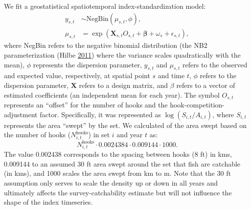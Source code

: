 \documentclass[11pt]{book}
\begin{document}
We fit a geostatistical spatiotemporal index-standardization model:
\begin{align}
  y_{s,t} &\sim \mathrm{NegBin}\left(\mu_{s,t}, \phi \right),\\
  \mu_{s,t} &= \exp \left( \bm{X}_{s,t} O_{s,t} + \bm{\beta} + \omega_s + \epsilon_{s,t} \right),
\label{eq:hbll-model}
\end{align}
where NegBin refers to the negative binomial distribution (the NB2 parameterization (Hilbe \protect\hyperlink{ref-hilbe2011}{2011}) where the variance scales quadratically with the mean), \(\phi\) represents the dispersion parameter, \(y_{s,t}\) and \(\mu_{s,t}\) refers to the observed and expected value, respectively, at spatial point \(s\) and time \(t\), \(\phi\) refers to the dispersion parameter, \(\bm{X}\) refers to a design matrix, and \(\beta\) refers to a vector of estimated coefficients (an independent mean for each year). The symbol \(O_{s,t}\) represents an ``offset'' for the number of hooks and the hook-competition-adjustment factor. Specifically, it was represented as \(\log \left(S_{i,t} / A_{i,t} \right)\), where \(S_{i,t}\) represents the area ``swept'' by the set. We calculated of the area swept based on the number of hooks (\(N^\textrm{hooks}_{i,t}\)) in set \(i\) and year \(t\) as:
\begin{equation}
N^\textrm{hooks}_{i,t} \cdot 0.0024384 \cdot 0.009144 \cdot 1000.
\end{equation}
The value 0.002438 corresponds to the spacing between hooks (8 ft) in kms, 0.009144 to an assumed 30 ft area swept around the set that fish are catchable (in kms), and 1000 scales the area swept from km to m. Note that the 30 ft assumption only serves to scale the density up or down in all years and ultimately affects the survey-catchability estimate but will not influence the shape of the index timeseries.
\end{document}
